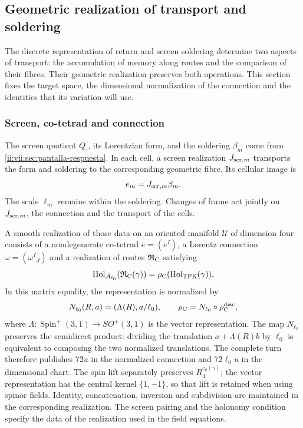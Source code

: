 \subsection{Geometric realization of transport and soldering}
\label{ii:vii:sec:realizacion-cartan}

The discrete representation of return and screen soldering
determine two aspects of transport: the accumulation of memory along
routes and the comparison of their fibres. Their geometric realization
preserves both operations. This section fixes the target
space, the dimensional normalization of the connection and the identities
that its variation will use.

\subsubsection{Screen, co-tetrad and connection}

The screen quotient \(Q_\square\), its Lorentzian form, and the
soldering \(\beta_m\) come from
\ref{ii:vii:sec:pantalla-respuesta}. In each cell, a screen realization
\(J_{{\rm scr},m}\) transports the form and soldering to the
corresponding geometric fibre. Its cellular image is
\[
 e_m=J_{{\rm scr},m}\beta_m.
\]
The scale \(\ell_m\) remains within the soldering. Changes
of frame act jointly on \(J_{{\rm scr},m}\), the connection
and the transport of the cells.

A smooth realization of those data on an oriented manifold
\(\mathcal U\) of dimension four consists of a nondegenerate
co-tetrad \(e=(e^I)\), a Lorentz connection
\(\omega=(\omega^I{}_J)\) and a realization of routes
\(\mathfrak R_{\rm C}\) satisfying
\begin{equation}
 \operatorname{Hol}_{\mathcal A_{\ell_0}}
       (\mathfrak R_{\rm C}(\gamma))
 =\rho_{\rm C}(\operatorname{Hol}_{\rm TPK}(\gamma)).
 \label{ii:vii:eq:compatibilidad-holonomia-geometrica}
\end{equation}
In this matrix equality, the representation is normalized by
\[
 N_{\ell_0}(R,a)=(\Lambda(R),a/\ell_0),\qquad
 \rho_{\rm C}=N_{\ell_0}\circ\rho_{\rm C}^{\rm disc},
\]
where \(\Lambda:\operatorname{Spin}^+(3,1)\to SO^+(3,1)\)
is the vector representation. The map \(N_{\ell_0}\)
preserves the semidirect product: dividing the translation
\(a+\Lambda(R)b\) by \(\ell_0\) is equivalent to composing the
two normalized translations. The complete turn therefore publishes
\(72u\) in the normalized connection and \(72\ell_0u\) in the
dimensional chart. The spin lift separately preserves
\(R_4^{c_g(\gamma)}\); the vector representation has the
central kernel \(\{1,-1\}\), so that lift is retained
when using spinor fields.
Identity, concatenation, inversion and subdivision are maintained in the
corresponding realization. The screen pairing
and the holonomy condition specify the data of the
realization used in the field equations.

